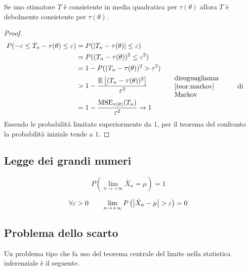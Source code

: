 \begin{teor}
	Se uno stimatore $T$ è consistente in media quadratica per $\tau(\theta)$ allora $T$ è debolmente consistente per $\tau(\theta)$.
\end{teor}
\begin{proof}
	\begin{align*}
		P(-\varepsilon\leq T_n-\tau(\theta)\leq \varepsilon) & = P(\abs{T_n-\tau(\theta)}\leq\varepsilon)                                                                         \\
		                                                     & = P((T_n-\tau(\theta))^2\leq\varepsilon^2)                                                                         \\
		                                                     & = 1 - P((T_n-\tau(\theta))^2>\varepsilon^2)                                                                        \\
		                                                     & > 1-\frac{\ev{(T_n-\tau(\theta))^2}}{\varepsilon^2} \bc{\parbox{35mm}{disuguaglianza \ref{teor:markov} di Markov}} \\
		                                                     & = 1-\frac{\MSE_{\tau(\theta)}(T_n)}{\varepsilon^2} \to 1
	\end{align*}
	Essendo le probabilità limitate superiormente da $1$, per il teorema del confronto la probabilità iniziale tende a $1$.
\end{proof}


\subsection{Legge dei grandi numeri}
\begin{teor}
	\begin{equation*}
		P\left(\lim_{n\to+\infty}\bar X_n = \mu\right) = 1
	\end{equation*}
\end{teor}

\begin{teor}
	\begin{equation*}
		\forall\varepsilon > 0 \qquad \lim_{n\to+\infty} P\left(\left\lvert \bar X_n - \mu \right\rvert > \varepsilon\right) = 0
	\end{equation*}
\end{teor}


\subsection{Problema dello scarto}
Un problema tipo che fa uso del teorema centrale del limite nella statistica inferenziale è il seguente.

